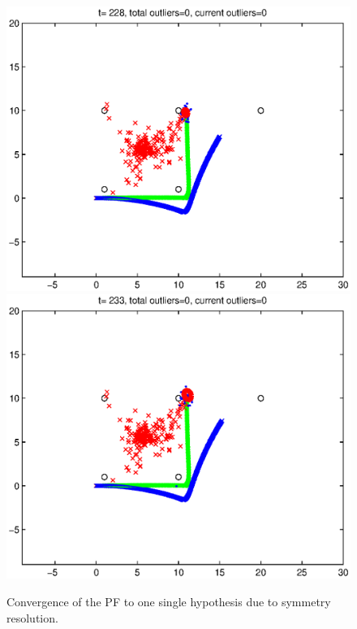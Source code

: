 \begin{figure}
	\includegraphics[scale=0.5]{./figures/M=10000/3.eps}
	\includegraphics[scale=0.5]{./figures/M=10000/4.eps}
	\caption{Convergence of the PF to one single hypothesis due to symmetry resolution.}
	\label{fig:pf_converge_10000}
\end{figure}